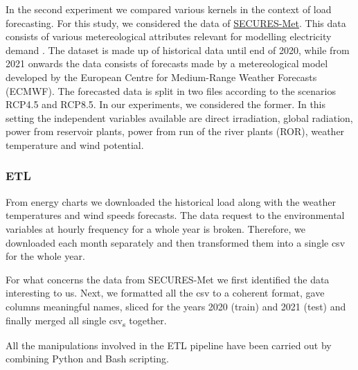 In the second experiment we compared various kernels in the context of load forecasting.
For this study, we considered the data of \href{https://zenodo.org/records/7907883}{SECURES-Met}. This data consists of various metereological attributes relevant for modelling electricity demand \cite{Formayer2023}. The dataset is made up of historical data until end of 2020, while from 2021 onwards the data consists of forecasts made by a metereological model developed by the European Centre for Medium-Range Weather Forecasts (ECMWF). The forecasted data is split in two files according to the scenarios RCP4.5 and RCP8.5. In our experiments, we considered the former. 
In this setting the independent variables available are 
direct irradiation, global radiation, power from reservoir plants, power from run of the river plants (ROR), weather temperature and wind potential.

\subsubsection{ETL}
From energy charts we downloaded the historical load along with the weather temperatures and wind speeds forecasts. The data request to the environmental variables at hourly frequency for a whole year is broken. Therefore, we downloaded each month separately and then transformed them into a single csv for the whole year.

For what concerns the data from SECURES-Met we first identified the data interesting to us. Next, we formatted all the csv to a coherent format, gave columns meaningful names, sliced for the years 2020 (train) and 2021 (test) and finally merged all single csv\textsubscript{s} together.

All the manipulations involved in the ETL pipeline have been carried out by combining Python and Bash scripting. 

